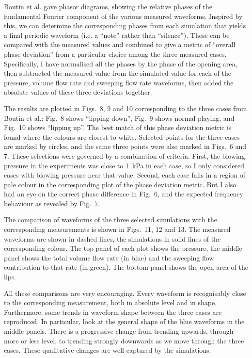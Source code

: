   Boutin et al. gave phasor diagrams, showing the relative phases of the 
  fundamental Fourier component of the various measured waveforms. Inspired by 
  this, we can determine the corresponding phases from each simulation that 
  yields a final periodic waveform (i.e. a ``note'' rather than ``silence''). 
  These can be compared with the measured values and combined to give a metric 
  of ``overall phase deviation'' from a particular choice among the three 
  measured cases. Specifically, I have normalised all the phases by the phase 
  of the opening area, then subtracted the measured value from the simulated 
  value for each of the pressure, volume flow rate and sweeping flow rate 
  waveforms, then added the absolute values of these three deviations together. 

  The results are plotted in Figs.\ 8, 9 and 10 corresponding to the three 
  cases from Boutin et al.: Fig.\ 8 shows ``lipping down'', Fig.\ 9 shows 
  normal playing, and Fig.\ 10 shows ``lipping up''. The best match of this 
  phase deviation metric is found where the colours are closest to white. 
  Selected points for the three cases are marked by circles, and the same three 
  points were also marked in Figs.\ 6 and 7. These selections were governed by 
  a combination of criteria. First, the blowing pressure in the experiments was 
  close to 1~kPa in each case, so I only considered cases with blowing pressure 
  near that value. Second, each case falls in a region of pale colour in the 
  corresponding plot of the phase deviation metric. But I also had an eye on 
  the correct phase difference in Fig.\ 6, and the expected frequency behaviour 
  as revealed by Fig.\ 7. 

  The comparison of waveforms of the three selected simulations with the 
  corresponding measurements is shown in Figs.\ 11, 12 and 13. The measured 
  waveforms are shown in dashed lines, the simulations in solid lines of the 
  corresponding colour. The top panel of each plot shows the pressure, the 
  middle panel shows the total volume flow rate (in blue) and the sweeping flow 
  contribution to that rate (in green). The bottom panel shows the open area of 
  the lips. 

  All these comparisons are very encouraging. Every waveform is recognisably 
  close to the corresponding measurement, both in absolute level and in shape. 
  Furthermore, some trends in waveform shape between the three cases are 
  reproduced. In particular, look at the general shape of the blue waveforms in 
  the middle panels. There is a progressive change from trending upwards, 
  through more or less level, to trending strongly downwards as we move through 
  the three cases. These qualitative changes are well captured by the 
  simulations. 

